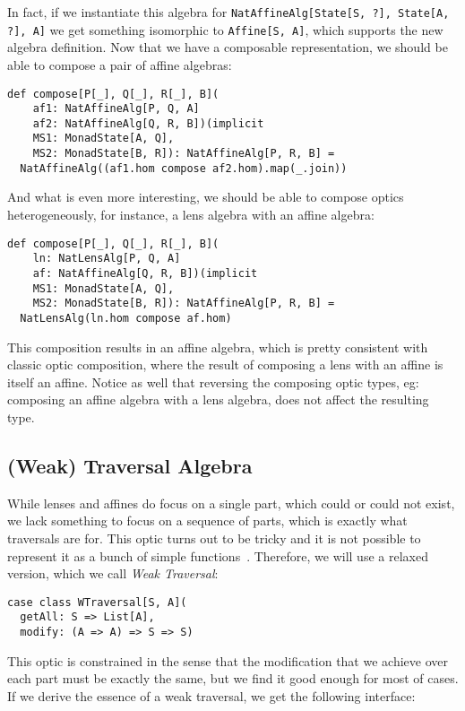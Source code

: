 \documentclass[preview, 3p]{elsarticle}
\begin{document}
In fact, if we instantiate this algebra for
\lstinline{NatAffineAlg[State[S, ?], State[A, ?], A]} we get something
isomorphic to \lstinline{Affine[S, A]}, which supports the new algebra
definition. Now that we have a composable representation, we should be able to
compose a pair of affine algebras:

\begin{lstlisting}
def compose[P[_], Q[_], R[_], B](
    af1: NatAffineAlg[P, Q, A]
    af2: NatAffineAlg[Q, R, B])(implicit
    MS1: MonadState[A, Q],
    MS2: MonadState[B, R]): NatAffineAlg[P, R, B] =
  NatAffineAlg((af1.hom compose af2.hom).map(_.join))
\end{lstlisting}

And what is even more interesting, we should be able to compose optics
heterogeneously, for instance, a lens algebra with an affine algebra:

\begin{lstlisting}
def compose[P[_], Q[_], R[_], B](
    ln: NatLensAlg[P, Q, A]
    af: NatAffineAlg[Q, R, B])(implicit
    MS1: MonadState[A, Q],
    MS2: MonadState[B, R]): NatAffineAlg[P, R, B] =
  NatLensAlg(ln.hom compose af.hom)
\end{lstlisting}

This composition results in an affine algebra, which is pretty consistent with
classic optic composition, where the result of composing a lens with an affine
is itself an affine. Notice as well that reversing the composing optic types,
eg: composing an affine algebra with a lens algebra, does not affect the
resulting type.

\subsection{(Weak) Traversal Algebra}

While lenses and affines do focus on a single part, which could or could not
exist, we lack something to focus on a sequence of parts, which is exactly what
traversals are for. This optic turns out to be tricky and it is not possible to
represent it as a bunch of simple functions~\cite{oconnor2011functor}.
Therefore, we will use a relaxed version, which we call \emph{Weak Traversal}:

\begin{lstlisting}
case class WTraversal[S, A](
  getAll: S => List[A],
  modify: (A => A) => S => S)
\end{lstlisting}

This optic is constrained in the sense that the modification that we achieve
over each part must be exactly the same, but we find it good enough for most of
cases. If we derive the essence of a weak traversal, we get the following
interface:
\end{document}

